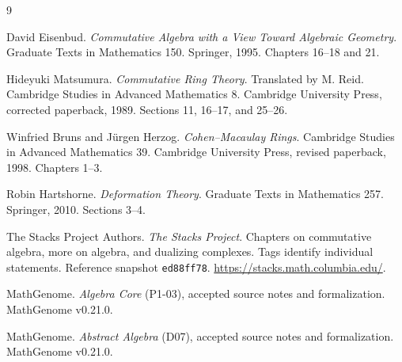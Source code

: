 \documentclass[11pt,oneside,openany]{book}
\theoremstyle{definition}
\theoremstyle{remark}
\begin{document}
\backmatter
\begin{thebibliography}{9}

David Eisenbud.
\emph{Commutative Algebra with a View Toward Algebraic Geometry}.
Graduate Texts in Mathematics 150. Springer, 1995. Chapters 16--18 and 21.

Hideyuki Matsumura.
\emph{Commutative Ring Theory}. Translated by M. Reid.
Cambridge Studies in Advanced Mathematics 8.
Cambridge University Press, corrected paperback, 1989. Sections 11, 16--17, and 25--26.

Winfried Bruns and J\"urgen Herzog.
\emph{Cohen--Macaulay Rings}. Cambridge Studies in Advanced Mathematics 39.
Cambridge University Press, revised paperback, 1998. Chapters 1--3.

Robin Hartshorne.
\emph{Deformation Theory}. Graduate Texts in Mathematics 257.
Springer, 2010. Sections 3--4.

The Stacks Project Authors.
\emph{The Stacks Project}. Chapters on commutative algebra, more on algebra, and dualizing complexes.
Tags identify individual statements. Reference snapshot \texttt{ed88ff78}.
\url{https://stacks.math.columbia.edu/}.

MathGenome.
\emph{Algebra Core} (P1-03), accepted source notes and formalization.
MathGenome v0.21.0.

MathGenome.
\emph{Abstract Algebra} (D07), accepted source notes and formalization.
MathGenome v0.21.0.
\end{thebibliography}
\end{document}
